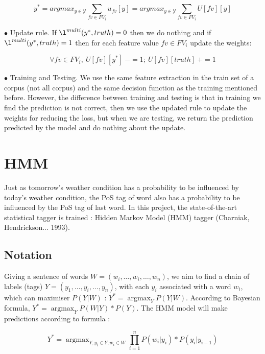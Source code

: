 \documentclass{article}
\def\YY{{\mathcal{Y}}}
\begin{document}
\begin{equation}
y^* = argmax_{y \in \YY} \sum_{fv \in FV_i} {u_{fv}[y]}
= argmax_{y \in \YY} \sum_{fv \in FV_i} {U[fv][y]}
\end{equation}

$\bullet$ Update rule. If $\l^{multi}(y^*, truth) = 0$ then we do nothing and if $\l^{multi}(y^*, truth) = 1$ then for each feature value $fv \in FV_i$ update the weights:

\begin{equation}
\forall fv \in FV_i,\  U[fv][y^*]\ -= 1;\ U[fv][truth]\ += 1
\end{equation} 

$\bullet$ Training and Testing. We use the same feature extraction in the train set of a corpus (not all corpus) and the same decision function as the training mentioned before. However, the difference between training and testing is that in training we find the prediction is not correct, then we use the updated rule to update the weights for reducing the loss, but when we are testing, we return the prediction predicted by the model and do nothing about the update.

\section{HMM}
Just as tomorrow's weather condition has a probability to be influenced by today's weather condition, the PoS tag of word also has a probability to be influenced by the PoS tag of last word. 
In this project, the state-of-the-art statistical tagger is trained : Hidden Markov Model (HMM) tagger (Charniak, Hendrickson... 1993).

\subsection{Notation}

Giving a sentence of words $W = (w_i,\dots,w_i,\dots,w_n)$, we aim to find a chain of labels (tags) $Y = (y_1,\dots,y_i,\dots,y_n)$, with each $y_i$ associated with a word $w_i$, which can maximiser $P(Y|W)$ : $Y^* = \mathop{\arg\max}_{Y} P(Y|W)$. According to Bayesian formula, $Y^* = \mathop{\arg\max}_{Y} P(W|Y)*P(Y)$. The HMM model will make predictions according to formula :

\begin{equation}
Y^* = \mathop{\arg\max}_{Y, y_i \in Y, w_i \in W} \prod_{i=1}^n P(w_i|y_i)*P(y_i|y_{i-1})
\end{equation}
\end{document}
